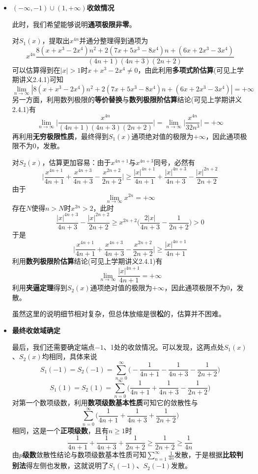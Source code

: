 \documentclass[a4paper,UTF8,fontset=windows,AutoFakeBold]{ctexart}
\newcommand*{\suminf}[1][n=1]{\sum_{#1}^\infty}
\newcommand*{\note}{\noindent *}
\theoremstyle{ex}
\begin{document}
\begin{framed}
{\begin{itemize}
        \item \textbf{$(-\infty,-1)\cup(1,+\infty)$收敛情况}
        
        此时，我们希望能够说明\textbf{通项极限非零}。

        对$S_1(x)$，提取出$x^{4n}$并通分整理得到通项为
        $$x^{4n}\frac{8(x+x^3-2x^4)n^2+2(7x+5x^3-8x^4)n+(6x+2x^3-3x^4)}{(4n+1)(4n+3)(2n+2)}$$
        可以估算得到在$|x|>1$时$x+x^3-2x^4\ne0$，由此利用\textbf{多项式阶估算}(可见上学期讲义2.4.1)可知
        $$\lim_{n\to\infty}|8(x+x^3-2x^4)n^2+2(7x+5x^3-8x^4)n+(6x+2x^3-3x^4)|=+\infty$$
        另一方面，利用数列极限的\textbf{等价替换}与\textbf{数列极限阶估算}结论(可见上学期讲义2.4.1)有
        $$\lim_{n\to\infty}\bigg|\frac{x^{4n}}{(4n+1)(4n+3)(2n+2)}\bigg|=\lim_{n\to\infty}\bigg|\frac{x^{4n}}{32n^3}\bigg|=+\infty$$
        再利用\textbf{无穷极限性质}，最终得到$S_1(x)$通项绝对值的极限为$+\infty$，因此通项极限不为0，发散。

        对$S_2(x)$，估算更加容易：由于$x^{4n+1}$与$x^{4n+3}$同号，必然有
        $$\bigg|\frac{x^{4n+1}}{4n+1}+\frac{x^{4n+3}}{4n+3}-\frac{x^{2n+2}}{2n+2}\bigg|\ge\frac{|x|^{4n+1}}{4n+1}+\frac{|x|^{4n+3}}{4n+3}-\frac{|x|^{2n+2}}{2n+2}$$
        由于
        $$\lim_{n\to\infty}x^{2n}=+\infty$$
        存在$N$使得$n>N$时$x^{2n}>2$，此时
        $$\frac{|x|^{4n+3}}{4n+3}-\frac{|x|^{2n+2}}{2n+2}\ge x^{2n+2}\bigg(\frac{2|x|}{4n+3}-\frac{1}{2n+2}\bigg)>0$$
        于是
        $$\bigg|\frac{x^{4n+1}}{4n+1}+\frac{x^{4n+3}}{4n+3}-\frac{x^{2n+2}}{2n+2}\bigg|\ge\frac{|x|^{4n+1}}{4n+1}$$
        利用\textbf{数列极限阶估算}结论(可见上学期讲义2.4.1)有
        $$\lim_{n\to\infty}\frac{|x|^{4n+1}}{4n+1}=+\infty$$
        利用\textbf{夹逼定理}得到$S_2(x)$通项绝对值的极限为$+\infty$，因此通项极限不为0，发散。

        \note 虽然这里的说明细节相对复杂，但总体放缩是很\textbf{松}的，估算并不困难。

        \item \textbf{最终收敛域确定}
        
        最后，我们还需要确定端点$-1$、1处的收敛情况。可以发现，这两点处$S_1(x)$、$S_2(x)$均相同，具体来说
        $$S_1(-1)=S_2(-1)=\suminf[n=0]\bigg(-\frac{1}{4n+1}-\frac{1}{4n+3}-\frac{1}{2n+2}\bigg)$$
        $$S_1(1)=S_2(1)=\suminf[n=0]\bigg(\frac{1}{4n+1}+\frac{1}{4n+3}-\frac{1}{2n+2}\bigg)$$
        对第一个数项级数，利用\textbf{数项级数基本性质}可知它的敛散性与
        $$\suminf[n=0]\bigg(\frac{1}{4n+1}+\frac{1}{4n+3}+\frac{1}{2n+2}\bigg)$$
        相同，这是一个\textbf{正项级数}，且有$n\ge1$时
        $$\frac{1}{4n+1}+\frac{1}{4n+3}+\frac{1}{2n+2}\ge\frac{1}{2n+2}\ge\frac{1}{4n}$$
        由\textbf{$p$级数}敛散性结论与数项级数基本性质可知$\suminf\frac{1}{4n}$发散，于是根据\textbf{比较判别法}得左侧也发散，这就说明了$S_1(-1)$、$S_2(-1)$发散。


\end{itemize}}
\end{framed}
\end{document}
